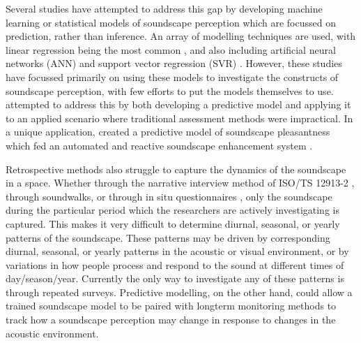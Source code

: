 \documentclass[
  authoryear,
  preprint,
  1p]{elsarticle}
\begin{document}
Several studies have attempted to address this gap by developing machine
learning or statistical models of soundscape perception which are
focussed on prediction, rather than inference. An array of modelling
techniques are used, with linear regression being the most common
\citep{Lionello2020systematic}, and also including artificial neural
networks (ANN) \citep{PuyanaRomero2016Modelling, Yu2009Modeling} and
support vector regression (SVR)
\citep{Fan2016Automatic, Fan2017Emo, Giannakopoulos2019Athens}. However,
these studies have focussed primarily on using these models to
investigate the constructs of soundscape perception, with few efforts to
put the models themselves to use. \citet{Mitchell2021Investigating}
attempted to address this by both developing a predictive model and
applying it to an applied scenario where traditional assessment methods
were impractical. In a unique application, \citet{Ooi2022Probably}
created a predictive model of soundscape pleasantness which fed an
automated and reactive soundscape enhancement system
\citep{Watcharasupat2022Autonomous}.

Retrospective methods also struggle to capture the dynamics of the
soundscape in a space. Whether through the narrative interview method of
ISO/TS 12913-2 \citep{ISO12913Part2}, through soundwalks, or through in
situ questionnaires \citep{Mitchell2020Soundscape}, only the soundscape
during the particular period which the researchers are actively
investigating is captured. This makes it very difficult to determine
diurnal, seasonal, or yearly patterns of the soundscape. These patterns
may be driven by corresponding diurnal, seasonal, or yearly patterns in
the acoustic or visual environment, or by variations in how people
process and respond to the sound at different times of day/season/year.
Currently the only way to investigate any of these patterns is through
repeated surveys. Predictive modelling, on the other hand, could allow a
trained soundscape model to be paired with longterm monitoring methods
to track how a soundscape perception may change in response to changes
in the acoustic environment.
\end{document}
